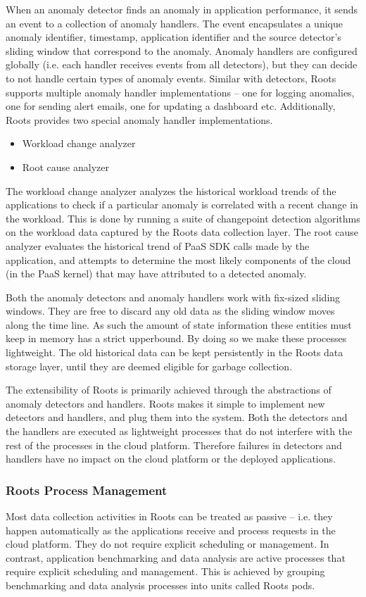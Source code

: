 When an anomaly detector finds an anomaly in application performance, it sends an event
to a collection of anomaly handlers. The event encapsulates a unique anomaly identifier, 
timestamp, application identifier and the source detector's sliding window that correspond to the
anomaly. Anomaly handlers are configured globally (i.e. each handler
receives events from all detectors), but they can decide to not handle certain types
of anomaly events. Similar with detectors, Roots supports multiple anomaly handler
implementations -- one for logging anomalies, one for sending alert emails, one
for updating a dashboard etc. Additionally, Roots provides two special anomaly handler
implementations.
\begin{itemize}
\item Workload change analyzer
\item Root cause analyzer
\end{itemize}

The workload change analyzer analyzes the historical workload trends of the applications to
check if a particular anomaly is correlated with a recent change in the workload.
This is done by running a suite of changepoint detection algorithms on the workload
data captured by the Roots data collection layer. The root cause analyzer evaluates
the historical trend of PaaS SDK calls made by the application, and attempts to
determine the most likely components of the cloud (in the PaaS kernel) that may have 
attributed to a detected anomaly.

Both the anomaly detectors and anomaly handlers work with fix-sized sliding windows.
They are free to discard any old data as the sliding window moves along the time line.
As such the amount of state information these entities must keep in memory has
a strict upperbound. By doing so we make these processes lightweight. The old 
historical data can be kept persistently in the Roots data storage layer, until
they are deemed eligible for garbage collection.

The extensibility of Roots is primarily achieved through the abstractions of anomaly
detectors and handlers. Roots makes it simple to implement new detectors and handlers,
and plug them into the system. Both the detectors and the handlers are executed
as lightweight processes that do not interfere with the rest of the processes in
the cloud platform. Therefore failures in detectors and handlers have no impact
on the cloud platform or the deployed applications.

\subsubsection{Roots Process Management}
Most data collection activities in Roots can be treated as passive -- i.e. they
happen automatically as the applications receive and process requests in the cloud
platform. They do not require explicit scheduling or management. In contrast,
application benchmarking and data analysis are active processes that require
explicit scheduling and management.  This is achieved by grouping benchmarking
and data analysis processes into units called Roots pods. 

